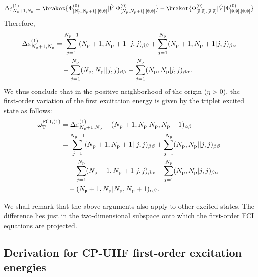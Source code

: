 \documentclass[11pt]{article}
\begin{document}
\begin{equation}
    \Delta \varepsilon^{(1)}_{N_{\rm p}+1,N_{\rm p}}=\braket{\Phi_{[N_{\rm p},N_{\rm p}+1],[\emptyset,\emptyset]}^{(0)}| \hat{V}|\Phi_{[N_{\rm p},N_{\rm p}+1],[\emptyset,\emptyset]}^{(0)}}-\braket{\Phi_{[\emptyset,\emptyset],[\emptyset,\emptyset]}^{(0)}| \hat{V}|\Phi_{[\emptyset,\emptyset],[\emptyset,\emptyset]}^{(0)}}
    \label{eqn:diff of first-order excitation energies}
\end{equation}
Therefore,
\begin{align*}
    \Delta\varepsilon_{N_{\rm p}+1,N_{\rm p}}^{(1)}&=\sum_{j=1}^{N_{\rm p}-1}(N_{\rm p}+1,N_{\rm p}+1||j,j)_{\beta\beta}+\sum_{j=1}^{N_{\rm p}}(N_{\rm p}+1,N_{\rm p}+1|j,j)_{\beta\alpha}\\
    &\quad-\sum_{j=1}^{N_{\rm p}}(N_{\rm p},N_{\rm p}||j,j)_{\beta\beta}-\sum_{j=1}^{N_{\rm p}}(N_{\rm p},N_{\rm p}|j,j)_{\beta\alpha}.
\end{align*}
We thus conclude that in the positive neighborhood of the origin ($\eta>0$), the first-order variation of the first excitation energy is given by the triplet excited state as follows:
\begin{align*}
\omega_{\rm T}^{\rm FCI,(1)}&=\Delta\varepsilon^{(1)}_{N_{\rm p}+1, N_{\rm p}}-(N_{\rm p}+1, N_{\rm p}|N_{\rm p},N_{\rm p}+1)_{\alpha\beta}\\
&=\sum_{j=1}^{N_{\rm p}-1}(N_{\rm p}+1,N_{\rm p}+1||j, j)_{\beta\beta}+\sum_{j=1}^{N_{\rm p}}(N_{\rm p},N_{\rm p}||j, j)_{\beta\beta} \\
&\quad-\sum_{j=1}^{N_{\rm p}}(N_{\rm p}+1,N_{\rm p}+1|j, j)_{\beta\alpha}-\sum_{j=1}^{N_{\rm p}}(N_{\rm p},N_{\rm p}|j, j)_{\beta \alpha}\\
&\quad-(N_{\rm p}+1, N_{\rm p}|N_{\rm p},N_{\rm p}+1)_{\alpha\beta}.
\end{align*}

\par We shall remark that the above arguments also apply to other excited states. The difference lies just in the two-dimensional subspace onto which the first-order FCI equations are projected. 

\subsection{Derivation for CP-UHF first-order excitation energies}
\end{document}
